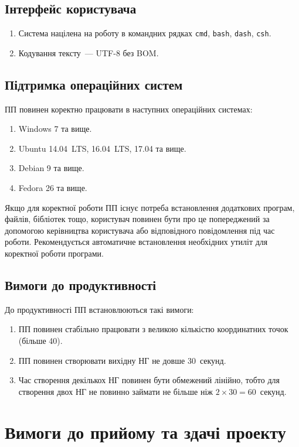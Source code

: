 \documentclass[a4paper,oneside,DIV=12,12pt]{scrartcl}
\newcommand{\cmdtoolname}[1]{\texttt{#1}}
\begin{document}
		\subsection{Інтерфейс користувача}
			\begin{enumerate}
				\item Система націлена на роботу в командних рядках \cmdtoolname{cmd}, \cmdtoolname{bash}, \cmdtoolname{dash}, \cmdtoolname{csh}.
				\item Кодування тексту~— UTF-8 без BOM.
			\end{enumerate}

		\subsection{Підтримка операційних систем}

			ПП повинен коректно працювати в наступних операційних системах:
			\begin{enumerate}
				\item Windows 7 та вище.
				\item Ubuntu 14.04~LTS, 16.04~LTS, 17.04 та вище.
				\item Debian 9 та вище.
				\item Fedora 26 та вище.
			\end{enumerate}
			
			Якщо для коректної роботи ПП існує потреба встановлення додаткових програм, файлів, бібліотек тощо, користувач повинен бути про це попереджений за допомогою керівництва користувача або відповідного повідомлення під час роботи. Рекомендується автоматичне встановлення необхідних утиліт для коректної роботи програми.

		\subsection{Вимоги до продуктивності}
			До продуктивності ПП встановлюються такі вимоги:
			\begin{enumerate}
				\item ПП повинен стабільно працювати з великою кількістю координатних точок (більше 40).
				\item ПП повинен створювати вихідну НГ не довше 30~секунд.
				\item Час створення декількох НГ повинен бути обмежений лінійно, тобто для створення двох НГ не повинно займати не більше ніж $2 \times 30 = 60$~секунд.
			\end{enumerate}

	\section{Вимоги до прийому та здачі проекту}
\end{document}
